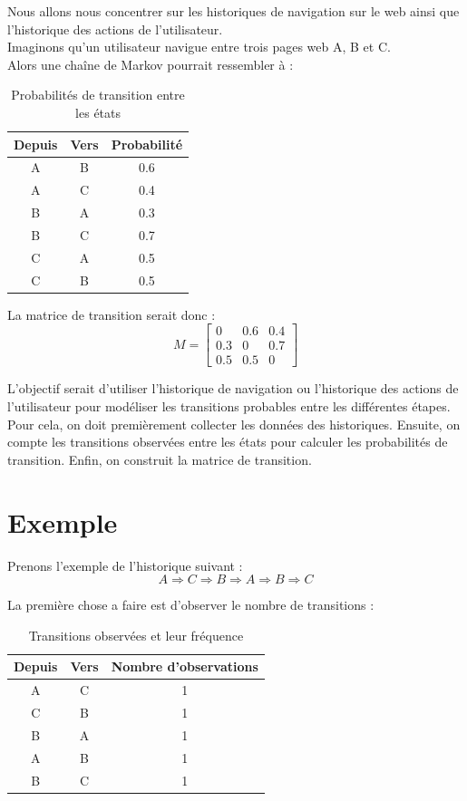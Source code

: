 \documentclass[a4paper, 11pt]{report}
\begin{document}
Nous allons nous concentrer sur les historiques de navigation sur le web ainsi que l'historique des actions de l'utilisateur. \\

Imaginons qu'un utilisateur navigue entre trois pages web A, B et C. \\
Alors une chaîne de Markov pourrait ressembler à : \\


\begin{table}[h!]
\centering
\begin{tabular}{|c|c|c|}
\hline
\textbf{Depuis} & \textbf{Vers} & \textbf{Probabilité} \\
\hline
A & B & 0.6 \\
A & C & 0.4 \\
B & A & 0.3 \\
B & C & 0.7 \\
C & A & 0.5 \\
C & B & 0.5 \\
\hline
\end{tabular}
\caption{Probabilités de transition entre les états}
\end{table}
La matrice de transition serait donc : \\

\[
M = 
\begin{bmatrix}
0 & 0.6 & 0.4 \\
0.3 & 0 & 0.7 \\
0.5 & 0.5 & 0
\end{bmatrix}
\]


L'objectif serait d'utiliser l'historique de navigation ou l'historique des actions de l'utilisateur pour modéliser les transitions probables entre les différentes étapes. \\
Pour cela, on doit premièrement collecter les données des historiques. Ensuite, on compte les transitions observées entre les états pour calculer les probabilités de transition. Enfin, on construit la matrice de transition. \\

\section{Exemple}

Prenons l'exemple de l'historique suivant : \\
\[
A \Longrightarrow C \Longrightarrow B \Longrightarrow A \Longrightarrow B \Longrightarrow C
\]

La première chose a faire est d'observer le nombre de transitions : 
\begin{table}[h!]
\centering
\begin{tabular}{|c|c|c|}
\hline
\textbf{Depuis} & \textbf{Vers} & \textbf{Nombre d'observations} \\
\hline
A & C & 1 \\
C & B & 1 \\
B & A & 1 \\
A & B & 1 \\
B & C & 1 \\
\hline
\end{tabular}
\caption{Transitions observées et leur fréquence}
\end{table}
\end{document}
